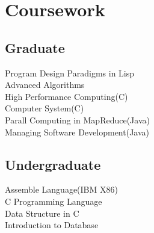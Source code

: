 \documentclass[a4paper]{lyu-resume} %
\begin{document}
\begin{minipage}[t]{0.33\textwidth}

\section{Coursework}

\subsection{Graduate}

Program Design Paradigms in Lisp \\
Advanced Algorithms \\
High Performance Computing(C)\\
Computer System(C) \\
Parall Computing in MapReduce(Java) \\
Managing Software Development(Java)

\sectionspace %
\subsection{Undergraduate}
Assemble Language(IBM X86) \\
C Programming Language \\
Data Structure in C \\
Introduction to Database

\sectionspace %
\end{minipage} %
\hfill
%
%
\end{document}
